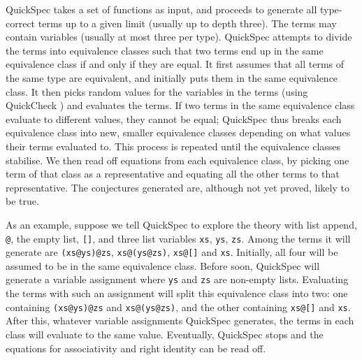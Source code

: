 QuickSpec takes a set of functions as input, and proceeds to generate all
type-correct terms up to a given limit (usually up to depth three).
The terms may contain variables (usually at most three per type).
QuickSpec attempts to divide the terms into equivalence classes such
that two terms end up in the same equivalence class if and only if
they are equal. It first assumes that all terms of the same type are
equivalent, and initially puts them in the same equivalence class.
It then picks random values for the variables in the terms
(using QuickCheck \cite{quickcheck}) and evaluates the terms.
If two terms in the same equivalence class evaluate to different
values, they cannot be equal; QuickSpec thus breaks each equivalence
class into new, smaller equivalence classes depending on what values
their terms evaluated to. This process is repeated until the
equivalence classes stabilise. We then read off equations from each
equivalence class, by picking one term of that class as a
representative and equating all the other terms to that representative.
The conjectures generated are, although not yet proved, likely to be true.

As an example, suppose we tell QuickSpec to explore the theory with list append,
\verb~@~, the empty list, \verb~[]~, and three list variables \verb~xs~,
\verb~ys~, \verb~zs~. Among the terms it will generate are
\verb~(xs@ys)@zs~, \verb~xs@(ys@zs)~, \verb~xs@[]~ and \verb~xs~.
Initially, all four will be assumed to be in the same equivalence class.
Before soon, QuickSpec will generate a variable assignment where
\verb~ys~ and \verb~zs~ are non-empty lists. Evaluating the terms with
such an assignment will split this equivalence class
into two: one containing \verb~(xs@ys)@zs~ and \verb~xs@(ys@zs)~,
and the other containing \verb~xs@[]~ and \verb~xs~.
After this, whatever variable assignments QuickSpec generates, the
terms in each class will evaluate to the same value.
Eventually, QuickSpec stops and the equations for associativity and
right identity can be read off.

